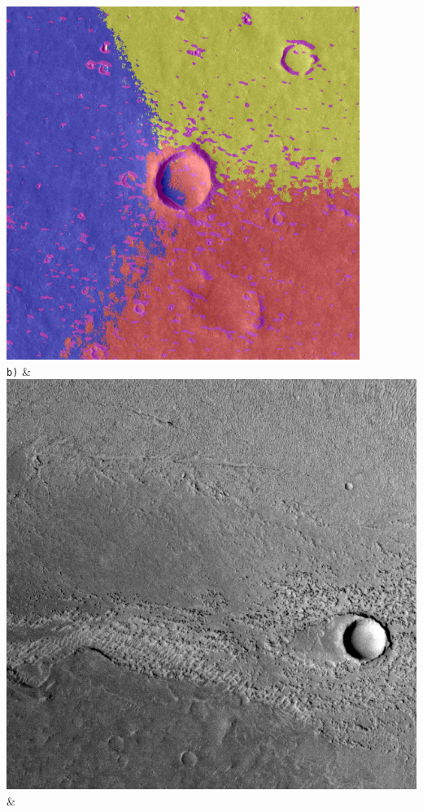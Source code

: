 \begin{table}[h!]
\begin{tabularx}{\textwidth}
		\includegraphics[width=0.9\linewidth]{images/gen/spatial_weight/p03_01.png_1.66.png} \\
		\texttt{b)} &
		\includegraphics[width=0.9\linewidth]{images/p03/p03_02.png} &

\end{tabularx}
\end{table}
